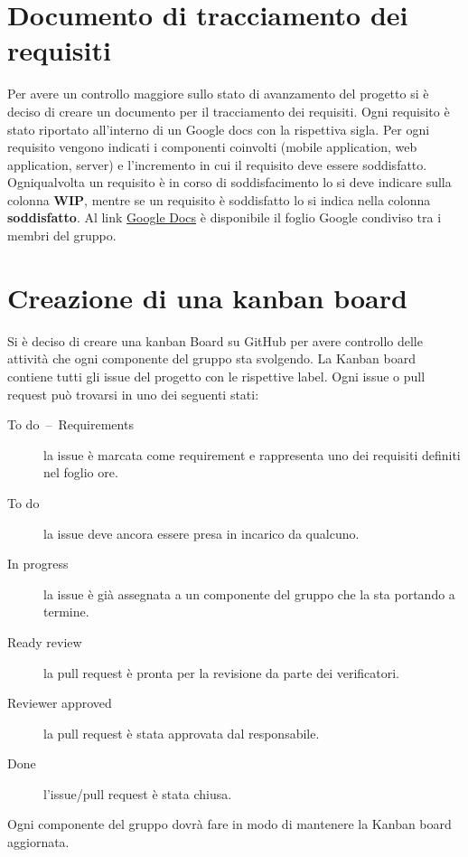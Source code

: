 \documentclass{article}
\begin{document}
\section{Documento di tracciamento dei requisiti}%
\label{sec:documento_di_tracciamento_dei_requisiti}

Per avere un controllo maggiore sullo stato di avanzamento del progetto si è deciso di creare un documento per il tracciamento dei requisiti.
Ogni requisito è stato riportato all'interno di un Google docs  con la rispettiva sigla.
Per ogni requisito vengono indicati i componenti coinvolti (mobile application, web application, server) e l'incremento in cui il requisito deve essere soddisfatto.
Ogniqualvolta un requisito è in corso di soddisfacimento lo si deve indicare sulla colonna \textbf{WIP}, mentre se un requisito è soddisfatto lo si indica nella colonna \textbf{soddisfatto}.
Al link \href{https://docs.google.com/spreadsheets/d/1J-RbNrb1yN_X1rVlKzpP9rjaiGst8B62k1K6EHY-grU/edit#gid=0}{Google Docs} è disponibile il foglio Google condiviso tra i membri del gruppo.

\section{Creazione di una kanban board}%
\label{sec:creazione_di_una_kanban_board}

Si è deciso di creare una kanban Board su GitHub per avere controllo delle attività che ogni componente del gruppo sta svolgendo.
La Kanban board contiene tutti gli issue del progetto con le rispettive label. Ogni issue o pull request può trovarsi in uno dei seguenti stati:
\begin{description}
  \item [To do~--~Requirements] la issue è marcata come requirement e rappresenta uno dei requisiti definiti nel foglio ore.
  \item [To do] la issue deve ancora essere presa in incarico da qualcuno.
  \item [In progress] la issue è già assegnata a un componente del gruppo che la sta portando a termine.
  \item [Ready review] la pull request è pronta per la revisione da parte dei verificatori.
  \item [Reviewer approved] la pull request è stata approvata dal responsabile.
  \item [Done] l'issue/pull request è stata chiusa.
\end{description}
Ogni componente del gruppo dovrà fare in modo di mantenere la Kanban board aggiornata.
\end{document}
